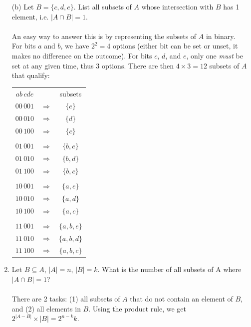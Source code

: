\documentclass[10pt,a4paper,final]{article}
\begin{document}
\begin{enumerate}
(b) Let $B = \{c, d, e\}$. List all subsets of $A$ whose intersection with $B$ has 1 element,
i.e. $|A \cap B| = 1$.\\
\\
An easy way to answer this is by representing the subsets of $A$ in binary.\\
For bits $a$ and $b$, we have $2^2 = 4$ options (either bit can be set or unset,
it makes no difference on the outcome).
For bits $c$, $d$, and $e$, only one \emph{must} be set at any given time, thus 3 options.
There are then $4 \times 3 = 12$ subsets of $A$ that qualify:
\begin{tabular}{c c c}
$ab\,cde$ & & subsets\\
$00\,001$ & $\Rightarrow$ & $\{e\}$\\
$00\,010$ & $\Rightarrow$ & $\{d\}$\\
$00\,100$ & $\Rightarrow$ & $\{c\}$\\
\\ %
$01\,001$ & $\Rightarrow$ & $\{b,e\}$\\
$01\,010$ & $\Rightarrow$ & $\{b,d\}$\\
$01\,100$ & $\Rightarrow$ & $\{b,c\}$\\
\\ %
$10\,001$ & $\Rightarrow$ & $\{a,e\}$\\
$10\,010$ & $\Rightarrow$ & $\{a,d\}$\\
$10\,100$ & $\Rightarrow$ & $\{a,c\}$\\
\\ %
$11\,001$ & $\Rightarrow$ & $\{a,b,e\}$\\
$11\,010$ & $\Rightarrow$ & $\{a,b,d\}$\\
$11\,100$ & $\Rightarrow$ & $\{a,b,c\}$\\
\end{tabular}

\item %
Let $B \subseteq A$, $|A| = n$, $|B| = k$.
What is the number of all subsets of A where $|A \cap B| = 1$?\\
\\
There are 2 tasks: (1) all subsets of $A$ that do not contain an element of $B$,
and (2) all elements in $B$. Using the product rule,
we get $2^{|A - B|} \times |B| = 2^{n-k}k$.


\end{enumerate}
\end{document}
